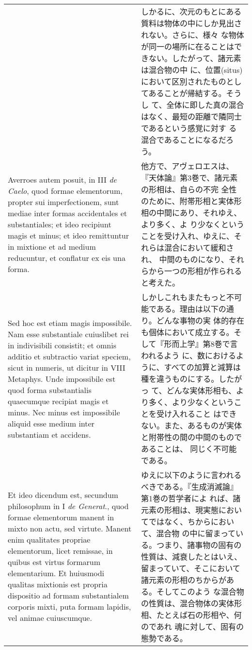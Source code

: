 \documentclass[paper=a4paper,fontsize=10pt,jafontsize=9pt,titlepage]{jlreq}
\begin{document}
\begin{longtable}{p{21em}p{21em}}
&

しかるに、次元のもとにある質料は物体の中にしか見出されない。さらに、様々
な物体が同一の場所に在ることはできない。したがって、諸元素は混合物の中
に、位置(situs)において区別されたものとしてあることが帰結する。そうし
て、全体に即した真の混合はなく、最短の距離で隣同士であるという感覚に対す
る混合であることになるだろう。
 
\\


Averroes autem posuit, in III {\itshape de Caelo}, quod formae
elementorum, propter sui imperfectionem, sunt mediae inter formas
accidentales et substantiales; et ideo recipiunt magis et minus; et
ideo remittuntur in mixtione et ad medium reducuntur, et conflatur ex
eis una forma.
 
&

 他方で、アヴェロエスは、『天体論』第3巻で、諸元素の形相は、自らの不完
 全性のために、附帯形相と実体形相の中間にあり、それゆえ、より多く、よ
 り少なくということを受け入れ、ゆえに、それらは混合において緩和され、
 中間のものになり、それらから一つの形相が作られると考えた。

 
\\

Sed hoc est etiam magis impossibile. Nam esse substantiale
cuiuslibet rei in indivisibili consistit; et omnis additio et
subtractio variat speciem, sicut in numeris, ut dicitur in VIII
Metaphys. Unde impossibile est quod forma substantialis quaecumque
recipiat magis et minus. Nec minus est impossibile aliquid esse medium
inter substantiam et accidens.

&

 しかしこれもまたもっと不可能である。理由は以下の通り。どんな事物の実
 体的存在も個体において成立する。そして『形而上学』第8巻で言われるよう
 に、数におけるように、すべての加算と減算は種を違うものにする。したがっ
 て、どんな実体形相も、より多く、より少なくということを受け入れること
 はできない。また、あるものが実体と附帯性の間の中間のものであることは、
 同じく不可能である。
 
\\


Et ideo dicendum est, secundum philosophum in I {\itshape de
Generat}., quod formae elementorum manent in mixto non actu, sed
virtute. Manent enim qualitates propriae elementorum, licet remissae,
in quibus est virtus formarum elementarium. Et huiusmodi qualitas
mixtionis est propria dispositio ad formam substantialem corporis
mixti, puta formam lapidis, vel animae cuiuscumque.

 &

 ゆえに以下のように言われるべきである。『生成消滅論』第1巻の哲学者によ
 れば、諸元素の形相は、現実態においてではなく、ちからにおいて、混合物
 の中に留まっている。つまり、諸事物の固有の性質は、減衰したとはいえ、
 留まっていて、そこにおいて諸元素の形相のちからがある。そしてこのよう
 な混合物の性質は、混合物体の実体形相、たとえば石の形相や、何のであれ
 魂に対して、固有の態勢である。

\end{longtable}
\end{document}
